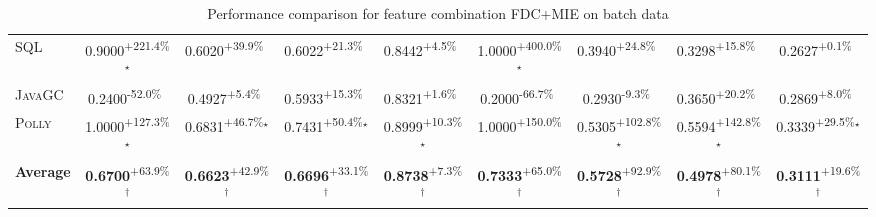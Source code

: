 \begin{table}[htbp]
\begin{tabular}{l|cccc|cccc}
\textsc{SQL} & \cellcolor{green!30}0.9000\textsuperscript{+221.4\%}$^\star$ & \cellcolor{green!30}0.6020\textsuperscript{+39.9\%}$^{\,\,\,}$ & \cellcolor{green!30}0.6022\textsuperscript{+21.3\%}$^{\,\,\,}$ & \cellcolor{green!30}0.8442\textsuperscript{+4.5\%}$^{\,\,\,}$ & \cellcolor{green!30}1.0000\textsuperscript{+400.0\%}$^\star$ & \cellcolor{green!30}0.3940\textsuperscript{+24.8\%}$^{\,\,\,}$ & \cellcolor{green!30}0.3298\textsuperscript{+15.8\%}$^{\,\,\,}$ & \cellcolor{green!30}0.2627\textsuperscript{+0.1\%}$^{\,\,\,}$ \\
\textsc{JavaGC} & \cellcolor{red!30}0.2400\textsuperscript{-52.0\%}$^{\,\,\,}$ & \cellcolor{green!30}0.4927\textsuperscript{+5.4\%}$^{\,\,\,}$ & \cellcolor{green!30}0.5933\textsuperscript{+15.3\%}$^{\,\,\,}$ & \cellcolor{green!30}0.8321\textsuperscript{+1.6\%}$^{\,\,\,}$ & \cellcolor{red!30}0.2000\textsuperscript{-66.7\%}$^{\,\,\,}$ & \cellcolor{red!30}0.2930\textsuperscript{-9.3\%}$^{\,\,\,}$ & \cellcolor{green!30}0.3650\textsuperscript{+20.2\%}$^{\,\,\,}$ & \cellcolor{green!30}0.2869\textsuperscript{+8.0\%}$^{\,\,\,}$ \\
\textsc{Polly} & \cellcolor{green!30}1.0000\textsuperscript{+127.3\%}$^\star$ & \cellcolor{green!30}0.6831\textsuperscript{+46.7\%}$^\star$ & \cellcolor{green!30}0.7431\textsuperscript{+50.4\%}$^\star$ & \cellcolor{green!30}0.8999\textsuperscript{+10.3\%}$^\star$ & \cellcolor{green!30}1.0000\textsuperscript{+150.0\%}$^{\,\,\,}$ & \cellcolor{green!30}0.5305\textsuperscript{+102.8\%}$^\star$ & \cellcolor{green!30}0.5594\textsuperscript{+142.8\%}$^\star$ & \cellcolor{green!30}0.3339\textsuperscript{+29.5\%}$^\star$ \\
\hline
\textbf{Average} & \cellcolor{green!30}\textbf{0.6700}\textsuperscript{+63.9\%}$^\dagger$ & \cellcolor{green!30}\textbf{0.6623}\textsuperscript{+42.9\%}$^\dagger$ & \cellcolor{green!30}\textbf{0.6696}\textsuperscript{+33.1\%}$^\dagger$ & \cellcolor{green!30}\textbf{0.8738}\textsuperscript{+7.3\%}$^\dagger$ & \cellcolor{green!30}\textbf{0.7333}\textsuperscript{+65.0\%}$^\dagger$ & \cellcolor{green!30}\textbf{0.5728}\textsuperscript{+92.9\%}$^\dagger$ & \cellcolor{green!30}\textbf{0.4978}\textsuperscript{+80.1\%}$^\dagger$ & \cellcolor{green!30}\textbf{0.3111}\textsuperscript{+19.6\%}$^\dagger$ \\
\hline
\end{tabular}
\caption{Performance comparison for feature combination FDC+MIE on batch data}
\label{tab:combo_FDC_MIE_performance_batch}
\end{table}